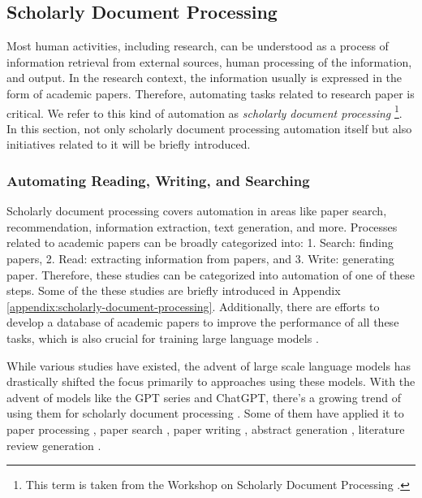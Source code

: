 \documentclass{article}
\begin{document}
\subsection{Scholarly Document Processing}
Most human activities, including research, can be understood as a process of information retrieval from external sources, human processing of the information, and output. In the research context, the information usually is expressed in the form of academic papers. Therefore, automating 
tasks related to research paper is critical. We refer to this kind of automation as \textit{scholarly document processing} \footnote{
This term is taken from the Workshop on Scholarly Document Processing \cite{wssdp}.
}. In this section, not only scholarly document processing automation itself but also initiatives related to it will be briefly introduced.

\subsubsection{Automating Reading, Writing, and Searching}
Scholarly document processing covers automation in areas like paper search, recommendation, information extraction, text generation, and more. Processes related to academic papers can be broadly categorized into: 1. Search: finding papers, 2. Read: extracting information from papers, and 3. Write: generating paper. Therefore, these studies can be categorized into automation of one of these steps.  Some of the these studies are briefly introduced in Appendix \ref{appendix:scholarly-document-processing}. Additionally, there are efforts to develop a database of academic papers to improve the performance of all these tasks, which is also crucial for training large language models \cite{kinney2023semantic}. 

While various studies have existed, the advent of large scale language models has drastically shifted the focus primarily to approaches using these models. With the advent of models like the GPT series \cite{openai2023gpt} and ChatGPT, there's a growing trend of using them for scholarly document processing \cite{alzaabi2023chatgpt}. Some of them have applied it to paper processing \cite{elicit,scispace,van2023chatgpt}, paper search \cite{elicit,scispace}, paper writing \cite{transformer2022can}, abstract generation \cite{gao2023comparing}, literature review generation \cite{aydin2022openai}.

\end{document}
